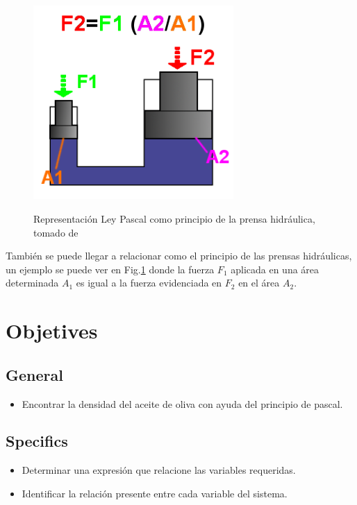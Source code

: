 \begin{figure}[h]
  \begin{center}
  \includegraphics[width=3in]{photo/Hydraulic_Force,_language_neutral.png}\\
  \caption{Representación Ley Pascal como principio de la prensa hidráulica, tomado de \cite{pascal-hidraulica}}\label{law-pascal-example-hidraulica}
  \end{center}
\end{figure}

También se puede llegar a relacionar como el principio de las prensas hidráulicas, un ejemplo se puede ver en Fig.\ref{law-pascal-example-hidraulica} donde la fuerza $F_{1}$ aplicada en una área determinada $A_{1}$ es igual a la fuerza evidenciada en $F_{2}$ en el área $A_{2}$. 
\section{Objetives}
\subsection{General}
\begin{itemize}
  \item Encontrar la densidad del aceite de oliva con ayuda del principio de pascal.
\end{itemize}

\subsection{Specifics}
 \begin{itemize}
  \item Determinar una expresión que relacione las variables requeridas.
  \item Identificar la relación presente entre cada variable del sistema.
\end{itemize}

